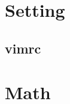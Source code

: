 \documentclass[10pt,landscape,a4paper,twocolumn]{article}
\begin{document}
\tableofcontents


\section{Setting}

\subsection{vimrc}
%


\section{Math}

%

%

%

%

%
\begin{comment}
\subsection{Kirchoff's Theorem}

ê·žëíì ì€íšë ížëŠ¬ì ê°ìë¥Œ êµ¬íë ì ëŠ¬.

ë¬Ží¥ ê·žëíì Laplacian matrix $L$ë¥Œ ë§ë ë€. ìŽê²ì (ì ì ì ì°šì ëê° íë ¬) - (ìžì íë ¬)ìŽë€.
$L$ìì íê³Œ ìŽì íëì© ì ê±°í ê²ì $L'$ëŒ íì. ìŽë í/ìŽìŽë  êŽê³ ìë€.
ê·žëíì ì€íšë ížëŠ¬ì ê°ìë $det(L')$ìŽë€.
\end{comment}
\end{document}

